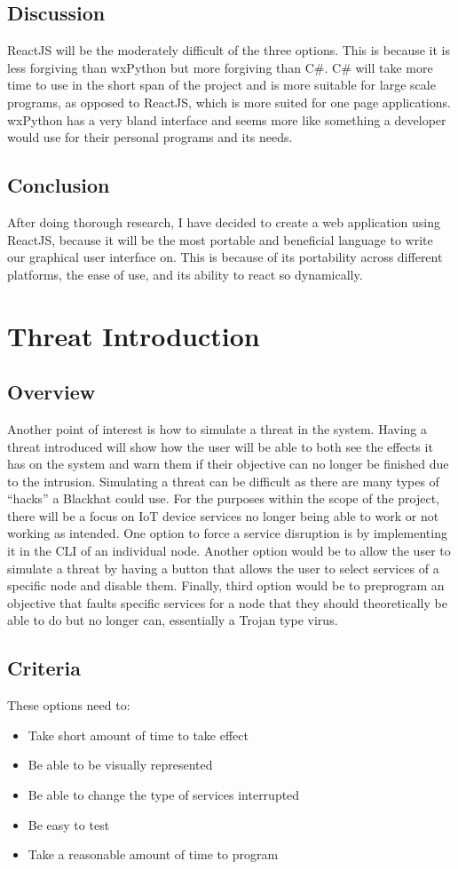 \documentclass[onecolumn, draftclsnofoot,10pt, compsoc]{IEEEtran}
\begin{document}
\subsection{Discussion}
ReactJS will be the moderately difficult of the three options. This is because it is less forgiving than wxPython but more forgiving than C\#. C\# will take more time to use in the short span of the project and is more suitable for large scale programs, as opposed to ReactJS, which is more suited for one page applications. wxPython has a very bland interface and seems more like something a developer would use for their personal programs and its needs.
\subsection{Conclusion}
After doing thorough research, I have decided to create a web application using ReactJS, because it will be the most portable and beneficial language to write our graphical user interface on. This is because of its portability across different platforms, the ease of use, and its ability to react so dynamically.

\section{Threat Introduction}
\subsection{Overview}
Another point of interest is how to simulate a threat in the system. Having a threat introduced  will show how the user will be able to both see the effects it has on the system and warn them if their objective can no longer be finished due to the intrusion. Simulating a threat can be difficult as there are many types of “hacks” a Blackhat could use. For the purposes within the scope of the project, there will be a focus on IoT device services no longer being able to work or not working as intended. One option to force a service disruption is by implementing it in the CLI of an individual node. Another option would be to allow the user to simulate a threat by having a button that allows the user to select services of a specific node and disable them. Finally, third option would be to preprogram an objective that faults specific services for a node that they should theoretically be able to do but no longer can, essentially a Trojan type virus. 
\subsection{Criteria}
These options need to:
\begin{itemize}
    \item Take short amount of time to take effect
    \item Be able to be visually represented
    \item Be able to change the type of services interrupted
    \item Be easy to test
    \item Take a reasonable amount of time to program
\end{itemize}
\end{document}
